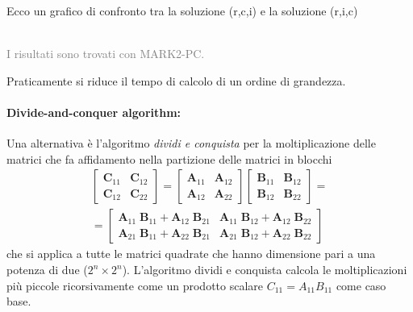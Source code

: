 \documentclass[10pt]{article}
\begin{document}
Ecco un grafico di confronto tra la soluzione (r,c,i) e la soluzione (r,i,c)

\\\textcolor{gray}{I risultati sono trovati con MARK2-PC.}

Praticamente si riduce il tempo di calcolo di un ordine di grandezza.






\paragraph{Divide-and-conquer algorithm:} Una alternativa è l'algoritmo \textit{dividi e conquista} per la moltiplicazione delle matrici che fa affidamento nella partizione delle matrici in blocchi
\begin{multline}
\begin{bmatrix}
\mathbf{C}_{11} & \mathbf{C}_{12} \\
\mathbf{C}_{12} & \mathbf{C}_{22}
\end{bmatrix} = 
\begin{bmatrix}
\mathbf{A}_{11} & \mathbf{A}_{12} \\
\mathbf{A}_{12} & \mathbf{A}_{22}
\end{bmatrix}
\begin{bmatrix}
\mathbf{B}_{11} & \mathbf{B}_{12} \\
\mathbf{B}_{12} & \mathbf{B}_{22}
\end{bmatrix} = \\
=
\begin{bmatrix}
\mathbf{A}_{11}\;\mathbf{B}_{11}+\mathbf{A}_{12}\;\mathbf{B}_{21} & \mathbf{A}_{11}\;\mathbf{B}_{12}+\mathbf{A}_{12}\;\mathbf{B}_{22} \\
\mathbf{A}_{21}\;\mathbf{B}_{11}+\mathbf{A}_{22}\;\mathbf{B}_{21} & \mathbf{A}_{21}\;\mathbf{B}_{12}+\mathbf{A}_{22}\;\mathbf{B}_{22}
\end{bmatrix}
\end{multline}
che si applica a tutte le matrici quadrate che hanno dimensione pari a una potenza di due (${2^n \times 2^n}$).
L'algoritmo dividi e conquista calcola le moltiplicazioni più piccole ricorsivamente come un prodotto scalare $C_{11} = A_{11}B_{11}$ come caso base.
\end{document}
